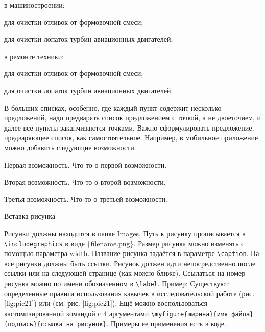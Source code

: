 \documentclass{report}
\begin{document}
\begin{enummarker}
  \item в машиностроении:
    \begin{enumarabic}
        \item для очистки отливок от формовочной смеси;
        \item для очистки лопаток турбин авиационных двигателей;   
    \end{enumarabic}
  \item в ремонте техники:
    \begin{enumarabic}
        \item для очистки отливок от формовочной смеси;
        \item для очистки лопаток турбин авиационных двигателей.  
    \end{enumarabic}
\end{enummarker}


В больших списках,  особенно, где каждый пункт содержит несколько 
предложений, надо предварять список предложением с точкой, а не двоеточием, и далее все пункты заканчиваются точками. Важно сформулировать предложение, предваряющее список, как самостоятельное. Например, в мобильное приложение можно добавить следующие возможности. 
\begin{enummarker}
\item Первая возможность. Что-то о первой возможности.
\item Вторая возможность. Что-то о второй возможности.
\item Третья возможность. Что-то о третьей возможности.
\end{enummarker}


Вставка рисунка

Рисунки должны находится в папке Images. Путь к рисунку прописывается в \verb|\includegraphics|  в виде \{filename.png\}. Размер рисунка можно изменять с помощью параметра width. Название рисунка задаётся в параметре \verb|\caption|. На все рисунки должны быть ссылки. Рисунок должен идти непосредственно после ссылки или на следующей странице (как можно ближе). Ссылаться на номер рисунка можно по имени обозначенном в \verb|\label|. Пример: Существуют определенные правила использования кавычек в исследовательской работе (рис. \ref{fig:pic21}) \break или (см. рис. \ref{fig:pic21}). Ещё можно воспользоваться кастомизированной командой с 4 аргументами \verb|\myfigure{ширина}{имя файла}{подпись}{ссылка на рисунок}|. Примеры ее применения есть в коде.

\end{document}
